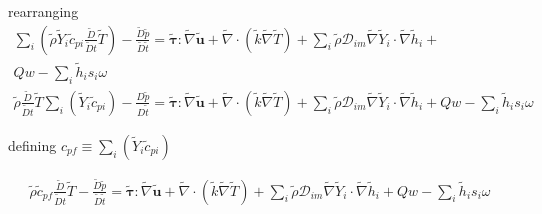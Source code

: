 \documentclass[preprint,12pt,authoryear]{elsarticle}
\begin{document}
rearranging
\begin{equation}
\begin{split}
        \sum\limits_i
        \left(
                \tilde{\rho}
                \tilde{Y}_i
                \tilde{c}_{pi}
                \frac{\tilde{D}}{\tilde{D} t}
                \tilde{T}
        \right)
        -
        \frac{\tilde{D} \tilde{p}}{\tilde{D}\tilde{t}}
        =
        \pmb{\tilde{\tau}}:\tilde{\nabla} \tilde{\mathbf{u}} 
        + 
        \tilde{\nabla} \cdot (\tilde{k}\tilde{\nabla} \tilde{T})
        +
        \sum\limits_i 
        \tilde{\rho}
        \mathcal{D}_{im}
        \tilde{\nabla}
        \tilde{Y}_i     
        \cdot
        \tilde{\nabla} 
        \tilde{h}_i
	+
\\
	Qw
	-
        \sum\limits_i
	\tilde{h}_i
        s_i \omega	
\\
        \tilde{\rho}
        \frac{\tilde{D}}{\tilde{D} t}
        \tilde{T}
        \sum\limits_i
        \left(
                \tilde{Y}_i
                \tilde{c}_{pi}
        \right)
        -
        \frac{D \tilde{p}}{D\tilde{t}}
        =
        \pmb{\tilde{\tau}}:\tilde{\nabla} \tilde{\mathbf{u}} 
        + 
        \tilde{\nabla} \cdot (\tilde{k}\tilde{\nabla} \tilde{T})
        +
        \sum\limits_i 
        \tilde{\rho}
        \mathcal{D}_{im}
        \tilde{\nabla}
        \tilde{Y}_i     
        \cdot
        \tilde{\nabla} 
        \tilde{h}_i
	+
	Qw
	-
        \sum\limits_i
	\tilde{h}_i
        s_i \omega	
\end{split}
\end{equation}

defining 
$
{c}_{pf}
\equiv
\sum\limits_i
\left(
        \tilde{Y}_i
        \tilde{c}_{pi}
\right)
$

\begin{equation}
\begin{split}
        \tilde{\rho}
        \tilde{c}_{pf}
        \frac{\tilde{D}}{\tilde{D} t}
        \tilde{T}
        -
        \frac{\tilde{D} \tilde{p}}{\tilde{D}\tilde{t}}
        =
        \pmb{\tilde{\tau}}:\tilde{\nabla} \tilde{\mathbf{u}} 
        + 
        \tilde{\nabla} \cdot (\tilde{k}\tilde{\nabla} \tilde{T})
        +
        \sum\limits_i 
        \tilde{\rho}
        \mathcal{D}_{im}
        \tilde{\nabla}
        \tilde{Y}_i     
        \cdot
        \tilde{\nabla} 
        \tilde{h}_i
	+
	Qw
	-
        \sum\limits_i
	\tilde{h}_i
        s_i \omega	
\end{split}
\end{equation}
\end{document}
